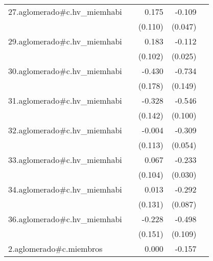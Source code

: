 {\begin{longtable}{l*{4}{D{.}{.}{-1}}}
\addlinespace
27.aglomerado#c.hv\_miemhabi&                     &       0.175         &      -0.109\sym{*}  &                     \\
            &                     &     (0.110)         &     (0.047)         &                     \\
\addlinespace
29.aglomerado#c.hv\_miemhabi&                     &       0.183         &      -0.112\sym{***}&                     \\
            &                     &     (0.102)         &     (0.025)         &                     \\
\addlinespace
30.aglomerado#c.hv\_miemhabi&                     &      -0.430\sym{*}  &      -0.734\sym{***}&                     \\
            &                     &     (0.178)         &     (0.149)         &                     \\
\addlinespace
31.aglomerado#c.hv\_miemhabi&                     &      -0.328\sym{*}  &      -0.546\sym{***}&                     \\
            &                     &     (0.142)         &     (0.100)         &                     \\
\addlinespace
32.aglomerado#c.hv\_miemhabi&                     &      -0.004         &      -0.309\sym{***}&                     \\
            &                     &     (0.113)         &     (0.054)         &                     \\
\addlinespace
33.aglomerado#c.hv\_miemhabi&                     &       0.067         &      -0.233\sym{***}&                     \\
            &                     &     (0.104)         &     (0.030)         &                     \\
\addlinespace
34.aglomerado#c.hv\_miemhabi&                     &       0.013         &      -0.292\sym{***}&                     \\
            &                     &     (0.131)         &     (0.087)         &                     \\
\addlinespace
36.aglomerado#c.hv\_miemhabi&                     &      -0.228         &      -0.498\sym{***}&                     \\
            &                     &     (0.151)         &     (0.109)         &                     \\
\addlinespace
2.aglomerado#c.miembros&                     &       0.000         &      -0.157\sym{***}&                     \\

\end{longtable}}
